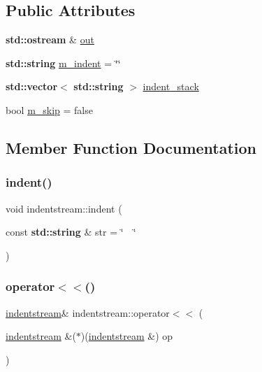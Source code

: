 \subsection*{Public Attributes}
\begin{DoxyCompactItemize}
\item 
\textbf{ std\+::ostream} \& \hyperlink{structindentstream_a17982da2855e0f5ef4f7b7408bd41883}{out}
\item 
\textbf{ std\+::string} \hyperlink{structindentstream_a679f1453bdd2a44b50d75e08e92132bc}{m\+\_\+indent} = \char`\"{}\char`\"{}
\item 
\textbf{ std\+::vector}$<$ \textbf{ std\+::string} $>$ \hyperlink{structindentstream_aad5afd8fa7ab3f0151a60fbbd07d7d9f}{indent\+\_\+stack}
\item 
bool \hyperlink{structindentstream_a79ad9a59e1315f8b6c29826a3684ad4a}{m\+\_\+skip} = false
\end{DoxyCompactItemize}


\subsection{Member Function Documentation}
\mbox{\label{structindentstream_a66e1cdf88e9c1de42135a386733e3220}} 
\subsubsection{\texorpdfstring{indent()}{indent()}}
{\footnotesize\ttfamily void indentstream\+::indent (\begin{DoxyParamCaption}\item[{const \textbf{ std\+::string} \&}]{str = {\ttfamily \char`\"{}~~\char`\"{}} }\end{DoxyParamCaption})\hspace{0.3cm}{\ttfamily [inline]}}

\mbox{\label{structindentstream_ab683899164b308cc57ed5c9d37c8f012}} 
\subsubsection{\texorpdfstring{operator$<$$<$()}{operator<<()}\hspace{0.1cm}{\footnotesize\ttfamily [1/2]}}
{\footnotesize\ttfamily \hyperlink{structindentstream}{indentstream}\& indentstream\+::operator$<$$<$ (\begin{DoxyParamCaption}\item[{\hyperlink{structindentstream}{indentstream} \&($\ast$)(\hyperlink{structindentstream}{indentstream} \&)}]{op }\end{DoxyParamCaption})\hspace{0.3cm}{\ttfamily [inline]}}

